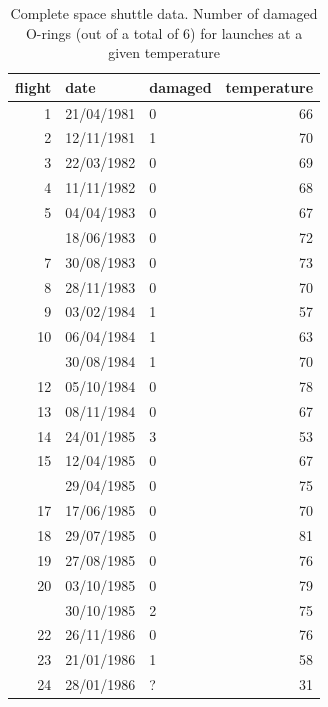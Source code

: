 \documentclass[
  11pt,
  british,
  openany, a4paper]{book}
\begin{document}
\begin{table}

\caption{\label{tab:tabshuttle2}Complete space shuttle data.  Number of damaged O-rings (out of a total of 6) for launches at a given temperature}
\centering
\begin{tabular}[t]{rllr}
\toprule
flight & date & damaged & temperature\\
\midrule
1 & 21/04/1981 & 0 & 66\\
2 & 12/11/1981 & 1 & 70\\
3 & 22/03/1982 & 0 & 69\\
4 & 11/11/1982 & 0 & 68\\
5 & 04/04/1983 & 0 & 67\\
\addlinespace
6 & 18/06/1983 & 0 & 72\\
7 & 30/08/1983 & 0 & 73\\
8 & 28/11/1983 & 0 & 70\\
9 & 03/02/1984 & 1 & 57\\
10 & 06/04/1984 & 1 & 63\\
\addlinespace
11 & 30/08/1984 & 1 & 70\\
12 & 05/10/1984 & 0 & 78\\
13 & 08/11/1984 & 0 & 67\\
14 & 24/01/1985 & 3 & 53\\
15 & 12/04/1985 & 0 & 67\\
\addlinespace
16 & 29/04/1985 & 0 & 75\\
17 & 17/06/1985 & 0 & 70\\
18 & 29/07/1985 & 0 & 81\\
19 & 27/08/1985 & 0 & 76\\
20 & 03/10/1985 & 0 & 79\\
\addlinespace
21 & 30/10/1985 & 2 & 75\\
22 & 26/11/1986 & 0 & 76\\
23 & 21/01/1986 & 1 & 58\\
24 & 28/01/1986 & ? & 31\\
\bottomrule
\end{tabular}
\end{table}
\end{document}
